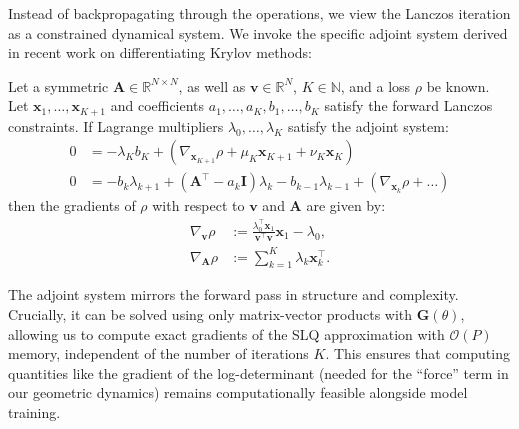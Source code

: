 Instead of backpropagating through the operations, we view the Lanczos iteration as a constrained dynamical system. We invoke the specific adjoint system derived in recent work on differentiating Krylov methods:

\begin{theorem}
\label{thm:lanczos_adjoint}
Let a symmetric $\mathbf{A} \in \mathbb{R}^{N \times N}$, as well as $\mathbf{v} \in \mathbb{R}^N$, $K \in \mathbb{N}$, and a loss $\rho$ be known. Let $\mathbf{x}_1, \dots, \mathbf{x}_{K+1}$ and coefficients $a_1, \dots, a_K, b_1, \dots, b_K$ satisfy the forward Lanczos constraints. If Lagrange multipliers $\lambda_0, \dots, \lambda_K$ satisfy the adjoint system:
\begin{subequations}
\begin{align}
    0 &= -\lambda_K b_K + (\nabla_{\mathbf{x}_{K+1}}\rho + \mu_K \mathbf{x}_{K+1} + \nu_K \mathbf{x}_K) \\
    0 &= -b_k \lambda_{k+1} + (\mathbf{A}^\top - a_k \mathbf{I})\lambda_k - b_{k-1}\lambda_{k-1} + (\nabla_{\mathbf{x}_k}\rho + \dots)
\end{align}
\end{subequations}
then the gradients of $\rho$ with respect to $\mathbf{v}$ and $\mathbf{A}$ are given by:
\begin{align}
    \nabla_{\mathbf{v}}\rho &:= \frac{\lambda_0^\top \mathbf{x}_1}{\mathbf{v}^\top \mathbf{v}} \mathbf{x}_1 - \lambda_0, \\
    \nabla_{\mathbf{A}}\rho &:= \sum_{k=1}^K \lambda_k \mathbf{x}_k^\top.
\end{align}
\end{theorem}



The adjoint system mirrors the forward pass in structure and complexity. Crucially, it can be solved using only matrix-vector products with $\mathbf{G}(\theta)$, allowing us to compute exact gradients of the SLQ approximation with $\mathcal{O}(P)$ memory, independent of the number of iterations $K$. This ensures that computing quantities like the gradient of the log-determinant (needed for the ``force'' term in our geometric dynamics) remains computationally feasible alongside model training.
